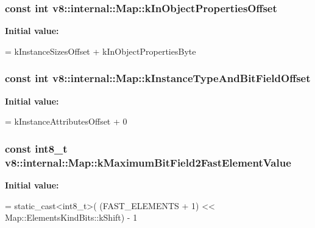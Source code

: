 \subsubsection[{k\+In\+Object\+Properties\+Offset}]{\setlength{\rightskip}{0pt plus 5cm}const int v8\+::internal\+::\+Map\+::k\+In\+Object\+Properties\+Offset\hspace{0.3cm}{\ttfamily [static]}}\label{classv8_1_1internal_1_1_map_abb892ea4c12b68553185322a4c851be9}
{\bfseries Initial value\+:}
\begin{DoxyCode}
=
      kInstanceSizesOffset + kInObjectPropertiesByte
\end{DoxyCode}
\hypertarget{classv8_1_1internal_1_1_map_ac879a7d4d5e42e2191fc8a4ef08871ee}{}
\subsubsection[{k\+Instance\+Type\+And\+Bit\+Field\+Offset}]{\setlength{\rightskip}{0pt plus 5cm}const int v8\+::internal\+::\+Map\+::k\+Instance\+Type\+And\+Bit\+Field\+Offset\hspace{0.3cm}{\ttfamily [static]}}\label{classv8_1_1internal_1_1_map_ac879a7d4d5e42e2191fc8a4ef08871ee}
{\bfseries Initial value\+:}
\begin{DoxyCode}
=
      kInstanceAttributesOffset + 0
\end{DoxyCode}
\hypertarget{classv8_1_1internal_1_1_map_a6ac920c0f1bde8b4b6bb83c2ada337d8}{}
\subsubsection[{k\+Maximum\+Bit\+Field2\+Fast\+Element\+Value}]{\setlength{\rightskip}{0pt plus 5cm}const int8\+\_\+t v8\+::internal\+::\+Map\+::k\+Maximum\+Bit\+Field2\+Fast\+Element\+Value\hspace{0.3cm}{\ttfamily [static]}}\label{classv8_1_1internal_1_1_map_a6ac920c0f1bde8b4b6bb83c2ada337d8}
{\bfseries Initial value\+:}
\begin{DoxyCode}
= \textcolor{keyword}{static\_cast<}int8\_t\textcolor{keyword}{>}(
      (FAST\_ELEMENTS + 1) << Map::ElementsKindBits::kShift) - 1
\end{DoxyCode}
\hypertarget{classv8_1_1internal_1_1_map_a11db99b6b39703668e4a5e184ba80d34}{}
